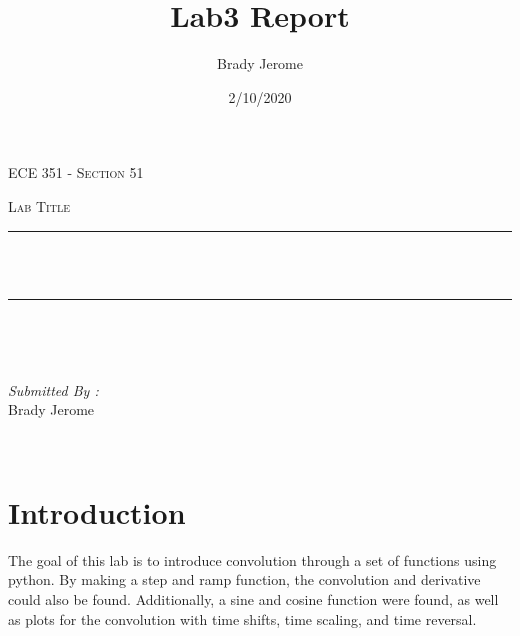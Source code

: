 \documentclass[12pt]{report}
\title{Lab3 Report}
\author{Brady Jerome}
\date{2/10/2020}
\makeatletter
\let\thetitle\@title
\makeatother
\begin{document}

\begin{titlepage}
	\centering
    \vspace*{0.5 cm}
\begin{center}    \textsc{\Large   ECE 351 - Section 51 }\\[2.0 cm]	\end{center}%
	\textsc{\Large Lab Title  }\\[0.5 cm]				%
	\rule{\linewidth}{0.2 mm} \\[0.4 cm]
	{ \huge \bfseries \thetitle}\\
	\rule{\linewidth}{0.2 mm} \\[1.5 cm]
	
	\begin{minipage}{0.4\textwidth}
		\begin{flushleft} \large
			\end{flushleft}
			\end{minipage}~
			\begin{minipage}{0.4\textwidth}
            
			\begin{flushright} \large
			\emph{Submitted By :} \\
			Brady Jerome  
		\end{flushright}
           
	\end{minipage}\\[2 cm]
	
    
    
    
    
	
\end{titlepage}


\tableofcontents
\pagebreak

\renewcommand{\thesection}{\arabic{section}}
\section{Introduction}

The goal of this lab is to introduce convolution through a set of functions using python. By making a step and ramp function, the convolution and derivative could also be found. Additionally, a sine and cosine function were found, as well as plots for the convolution with time shifts, time scaling, and time reversal.
\end{document}
